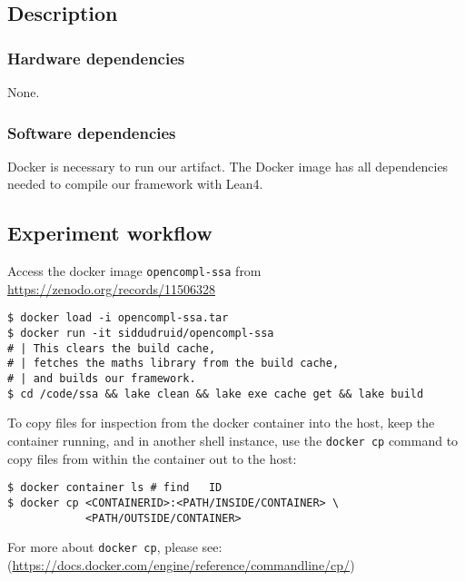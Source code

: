 \documentclass{sigplanconf}
\begin{document}
\subsection{Description}

\subsubsection{Hardware dependencies}

None.

\subsubsection{Software dependencies}

Docker is necessary to run our artifact. The Docker image has all dependencies needed to compile our framework with Lean4.



\subsection{Experiment workflow}

Access the docker image \texttt{opencompl-ssa} from
\url{https://zenodo.org/records/11506328}

\begin{verbatim}
$ docker load -i opencompl-ssa.tar
$ docker run -it siddudruid/opencompl-ssa
# | This clears the build cache,
# | fetches the maths library from the build cache,
# | and builds our framework.
$ cd /code/ssa && lake clean && lake exe cache get && lake build
\end{verbatim}

To copy files for inspection from the docker container into the host,
 keep the container running, and in another
shell instance, use the \texttt{docker cp}
command to copy files from within the container out to the host:

\begin{verbatim}
$ docker container ls # find   ID
$ docker cp <CONTAINERID>:<PATH/INSIDE/CONTAINER> \
            <PATH/OUTSIDE/CONTAINER>
\end{verbatim}
For more about \texttt{docker cp}, please see:
(\url{https://docs.docker.com/engine/reference/commandline/cp/})
\end{document}

